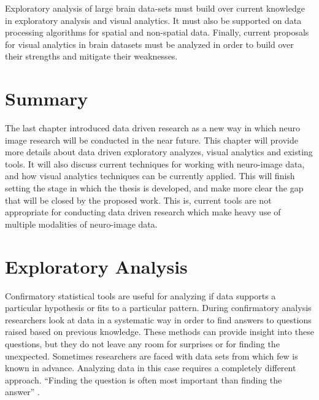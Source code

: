  
Exploratory analysis of large brain data-sets must build over current knowledge in exploratory analysis and visual analytics. It must also be supported on data processing algorithms for spatial and non-spatial data. Finally, current proposals for visual analytics in brain datasets must be analyzed in order to build over their strengths and mitigate their weaknesses.



\section{Summary}

The last chapter introduced data driven research as a new way in which neuro image research will be conducted in the near future. This chapter will provide more details about data driven exploratory analyzes, visual analytics and existing tools. It will also discuss current techniques for working with neuro-image data, and how visual analytics techniques can be currently applied. This will finish setting the stage in which the thesis is developed, and make more clear the gap that will be closed by the proposed work. This is, current tools are not appropriate for conducting data driven research which make heavy use of multiple modalities of neuro-image data.

\section{Exploratory Analysis}

%


Confirmatory statistical tools are useful for analyzing if data supports a particular hypothesis or fits to a particular pattern.  During confirmatory analysis researchers look at data in a systematic way in order to find answers to questions raised based on previous knowledge. These methods can provide insight into these questions, but they do not leave any room for surprises or for finding the unexpected. Sometimes researchers are faced with data sets from which few is known in advance. Analyzing data in this case requires a completely different approach. ``Finding the question is often most important than finding the answer'' \autocite{tukey_we_1980}.

